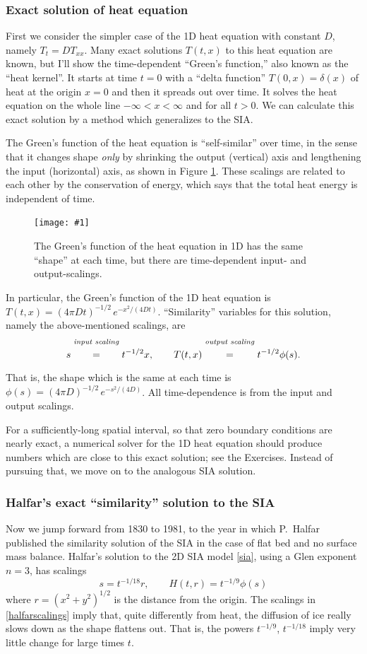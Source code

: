 \documentclass[titlepage,a4paper,final,12pt]{scrartcl}
\newcommand{\onefigsize}[3]{
\begin{figure}[ht]
\centering
\texttt{[image: \#1]}
\caption{#2}
\label{fig:#1}
\end{figure}}
\begin{document}
\subsubsection*{Exact solution of heat equation}  First we consider the simpler case of the 1D heat equation with constant $D$, namely $T_t = D T_{xx}$.  Many exact solutions $T(t,x)$ to this heat equation are known, but I'll show the time-dependent ``Green's function,'' also known as the ``heat kernel''.  It starts at time $t=0$ with a ``delta function'' $T(0,x)=\delta(x)$ of heat at the origin $x=0$ and then it spreads out over time.  It solves the heat equation on the whole line $-\infty<x<\infty$ and for all $t>0$.  We can calculate this exact solution by a method which generalizes to the SIA.

The Green's function of the heat equation is ``self-similar'' over time, in the sense that it changes shape \emph{only} by shrinking the output (vertical) axis and lengthening the input (horizontal) axis, as shown in Figure \ref{fig:heatscaling}.  These scalings are related to each other by the conservation of energy, which says that the total heat energy is independent of time.

\onefigsize{heatscaling}{The Green's function of the heat equation in 1D has the same ``shape'' at each time, but there are time-dependent input- and output-scalings.}{2.4in}

In particular, the Green's function of the 1D heat equation is $T(t,x) = (4 \pi D t)^{-1/2}\, e^{-x^2/(4Dt)}$.  ``Similarity'' variables for this solution, namely the above-mentioned scalings, are
	$$s \stackrel{\text{\emph{input scaling}}}{\phantom{\Big|}=\phantom{\Big|}} t^{-1/2} x, \qquad T(t,x) \stackrel{\text{\emph{output scaling}}}{\phantom{\Big|}=\phantom{\Big|}} t^{-1/2} \phi(s).$$
That is, the shape which is the same at each time is $\phi(s) = (4 \pi D)^{-1/2}\, e^{-s^2/(4D)}$.  All time-dependence is from the input and output scalings.

For a sufficiently-long spatial interval, so that zero boundary conditions are nearly exact, a numerical solver for the 1D heat equation should produce numbers which are close to this exact solution; see the Exercises.  Instead of pursuing that, we move on to the analogous SIA solution.

\subsubsection*{Halfar's exact ``similarity'' solution to the SIA}  Now we jump forward from 1830 to 1981, to the year in which P.~Halfar published the similarity solution of the SIA in the case of flat bed and no surface mass balance.  Halfar's solution to the 2D SIA model \eqref{sia}, using a Glen exponent $n=3$, has scalings
\begin{equation}
s = t^{-1/18} r, \qquad H(t,r)=t^{-1/9} \phi(s) \label{halfarscalings}
\end{equation}
where $r=(x^2+y^2)^{1/2}$ is the distance from the origin.  The scalings in \eqref{halfarscalings} imply that, quite differently from heat, the diffusion of ice really slows down as the shape flattens out.  That is, the powers $t^{-1/9}$, $t^{-1/18}$ imply very little change for large times $t$.
\end{document}
